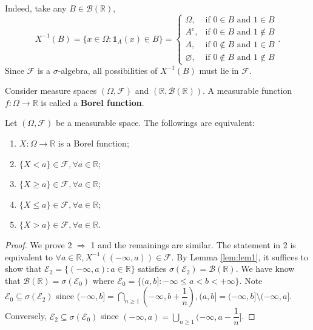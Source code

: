 \documentclass[11pt,singlecolumn, openany, citestyle=authoryear]{elegantbook}
\begin{document}
\begin{CJK}{UTF8}{gbsn}
\begin{example}
    Indeed, take any $B \in \mathcal{B}(\mathbb{R})$, 
    $$X^{-1}(B) = \{x\in \Omega: \mathds{1}_A(x) \in B\}=
    \begin{cases}
        \Omega, &\text{if } 0 \in B \text{ and } 1\in B\\
        A^c, &\text{if } 0 \in B \text{ and } 1\notin B\\
        A, &\text{if } 0 \notin B \text{ and } 1\in B\\
        \varnothing, &\text{if } 0 \notin B \text{ and } 1\notin B
    \end{cases}.
    $$
    Since $\mathcal{F}$ is a $\sigma$-algebra, all possibilities of $X^{-1}(B)$ must lie in 
    $\mathcal{F}$.
\end{example}

\begin{definition}
    Consider measure spaces $(\Omega,\mathcal{F})$ and $(\mathbb{R},\mathcal{B}(\mathbb{R}))$.
    A measurable function $f: \Omega \to \mathbb{R}$ is called a \textbf{Borel function}.
\end{definition}

\begin{corollary}\label{cor:cor1}
    Let $(\Omega,\mathcal{F})$ be a measurable space. The followings are equivalent:
    \begin{enumerate}
        \item $X:\Omega \to \mathbb{R}$ is a Borel function;
        \item $\{X<a\} \in \mathcal{F}, \forall a \in \mathbb{R}$;
        \item $\{X\geqslant a\} \in \mathcal{F}, \forall a \in \mathbb{R}$;
        \item $\{X\leqslant a\} \in \mathcal{F}, \forall a \in \mathbb{R}$;
        \item $\{X>a\} \in \mathcal{F}, \forall a \in \mathbb{R}$.
    \end{enumerate}
\end{corollary}
\begin{proof}
    We prove 2 $\Longrightarrow$ 1 and the remainings are similar. 
    The statement in 2 is equivalent to $\forall a \in \mathbb{R},
    X^{-1}((-\infty,a))\in \mathcal{F}$. By Lemma \ref{lem:lem1}, it suffices to show 
    that $\mathcal{E}_2 = \{(-\infty,a):a \in \mathbb{R}\}$ satisfies $\sigma(\mathcal{E}_2)
    =\mathcal{B}(\mathbb{R})$. We have know that $\mathcal{B}(\mathbb{R}) = \sigma(\mathcal{E}_0)$
    where $\mathcal{E}_0=\{(a,b]: -\infty \leqslant a < b <+\infty\}$. Note 
    $\mathcal{E}_0 \subseteq \sigma(\mathcal{E}_2)$ since $\displaystyle 
    (-\infty,b]=\bigcap_{n \geqslant 1}(-\infty , b+\dfrac{1}{n}), 
    (a,b]=(-\infty,b]\setminus (-\infty,a]$. Conversely, $\mathcal{E}_2 \subseteq 
    \sigma(\mathcal{E}_0)$ since 
    $\displaystyle (-\infty,a)=\bigcup_{n \geqslant 1}(-\infty,a-\dfrac{1}{n}]$.
\end{proof}



\end{CJK}
\end{document}
